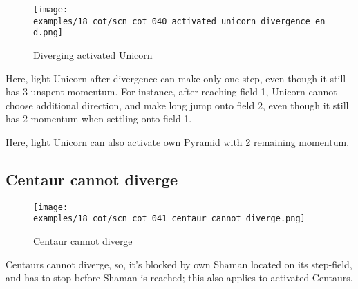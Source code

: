 \clearpage %

\vspace*{-2.1\baselineskip}
\noindent
\begin{figure}[!h]
\texttt{[image: examples/18\_cot/scn\_cot\_040\_activated\_unicorn\_divergence\_end.png]}
\vspace*{-1.3\baselineskip}
\caption{Diverging activated Unicorn}
\label{fig:scn_cot_040_activated_unicorn_divergence_end}
\end{figure}

\vspace*{-0.4\baselineskip}
Here, light Unicorn after divergence can make only one step, even though it still
has 3 unspent momentum. For instance, after reaching field 1, Unicorn cannot choose
additional direction, and make long jump onto field 2, even though it still has 2
momentum when settling onto field 1.

Here, light Unicorn can also activate own Pyramid with 2 remaining momentum.

\clearpage %

\subsection*{Centaur cannot diverge}
\label{sec:Conquest of Tlalocan/Divergence/Centaur cannot diverge}

\vspace*{-1.4\baselineskip}
\noindent
\begin{figure}[!h]
\texttt{[image: examples/18\_cot/scn\_cot\_041\_centaur\_cannot\_diverge.png]}
\vspace*{-1.3\baselineskip}
\caption{Centaur cannot diverge}
\label{fig:scn_cot_041_centaur_cannot_diverge}
\end{figure}

\vspace*{-0.5\baselineskip}
Centaurs cannot diverge, so, it's blocked by own Shaman located on its step-field,
and has to stop before Shaman is reached; this also applies to activated Centaurs.

\clearpage %

